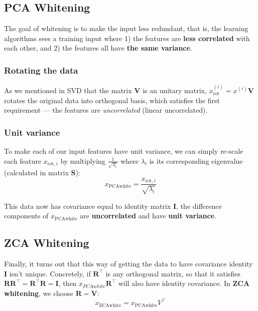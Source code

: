 \documentclass[a4paper, 12pt]{book} %
\begin{document}
\subsection{PCA Whitening}
The goal of whitening is to make the input less redundant, that is, the learning algorithms sees a training input where 1) the features are \textbf{less correlated} with each other, and 2) the features all have \textbf{the same variance}.

\subsubsection{Rotating the data}
As we mentioned in SVD that the matrix $\mathbf{V}$ is an unitary matrix, $x_{\mathrm{rot}}^{(i)}=x^{(i)}\mathbf{V}$ rotates the original data into orthogonal basis, which satisfies the first requirement --- the features are \emph{uncorrelated} (linear uncorrelated). 

\subsubsection{Unit variance}
To make each of our input features have unit variance, we can simply re-scale each feature $x_{\mathrm{rot},i}$ by multiplying $\frac{1}{\sqrt{\lambda_i}}$ where $\lambda_i$ is its corresponding eigenvalue (calculated in matrix $\mathbf{S}$):
\begin{equation}
x_{\mathrm{PCAwhite}}=\frac{x_{\mathrm{rot},i}}{\sqrt{\lambda_i}}
\end{equation}
 
This data now has covariance equal to identity matrix $\mathbf{I}$, the difference components of $x_{\mathrm{PCAwhite}}$ are \textbf{uncorrelated} and have \textbf{unit variance}.

\subsection{ZCA Whitening}
Finally, it turns out that this way of getting the data to have covariance identity $\mathbf{I}$ isn't unique. Concretely, if $\mathbf{R}^\top$ is any orthogonal matrix, so that it satisfies $\mathbf{R}\mathbf{R}^\top=\mathbf{R}^\top\mathbf{R}=\mathbf{I}$, then $x_{PCAwhite}\mathbf{R}^\top$ will also have identity covariance. In \textbf{ZCA whitening}, we choose $\mathbf{R}=\mathbf{V}$:
\begin{equation}
x_{\mathrm{ZCAwhite}}=x_{\mathrm{PCAwhite}}V^\top
\end{equation}
\end{document}
